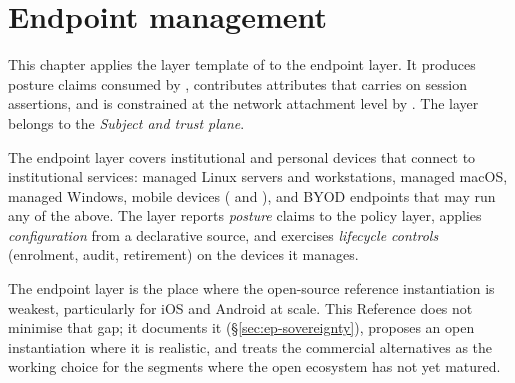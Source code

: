 
\chapter{Endpoint management}
\label{ch:endpoint}

\begin{caveatbox}[Dependencies]
\noindent This chapter applies the layer template of
 to the endpoint layer. It produces posture
claims consumed by , contributes attributes
that  carries on session assertions, and is
constrained at the network attachment level by
. The layer belongs to the \emph{Subject and
trust plane}.
\end{caveatbox}

The endpoint layer covers institutional and personal devices that
connect to institutional services: managed Linux servers and
workstations, managed macOS, managed Windows, mobile devices
( and ), and BYOD endpoints
that may run any of the above. The layer reports \emph{posture}
claims to the policy layer, applies \emph{configuration} from a
declarative source, and exercises \emph{lifecycle controls}
(enrolment, audit, retirement) on the devices it manages.

\begin{caveatbox}
\noindent The endpoint layer is the place where the open-source
reference instantiation is weakest, particularly for iOS and Android
at scale. This Reference does not minimise that gap; it documents
it (\S\ref{sec:ep-sovereignty}), proposes an open instantiation
where it is realistic, and treats the commercial alternatives as
the working choice for the segments where the open ecosystem has
not yet matured.
\end{caveatbox}

